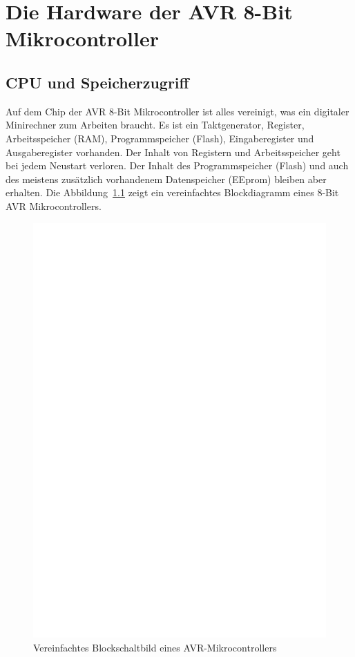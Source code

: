 \chapter{Die Hardware der AVR 8-Bit Mikrocontroller}

\section{CPU und Speicherzugriff}
Auf dem Chip der AVR 8-Bit Mikrocontroller ist alles vereinigt,
was ein digitaler Minirechner zum Arbeiten braucht.
Es ist ein Taktgenerator, Register, Arbeitsspeicher (RAM), Programmspeicher (Flash),
Eingaberegister und Ausgaberegister vorhanden. 
Der Inhalt von Registern und Arbeitsspeicher geht bei jedem Neustart verloren.
Der Inhalt des Programmspeicher (Flash) und auch des meistens zusätzlich vorhandenem
Datenspeicher (EEprom) bleiben aber erhalten.
Die Abbildung~\ref{fig:block} zeigt ein vereinfachtes Blockdiagramm eines
8-Bit AVR Mikrocontrollers.

\begin{figure}[H]
\centering
\includegraphics[]{../FIG/avr_block.eps}
\caption{Vereinfachtes Blockschaltbild eines AVR-Mikrocontrollers}
\label{fig:block}
\end{figure}


